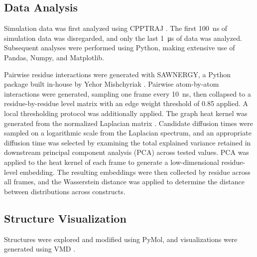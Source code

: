 \subsection{Data Analysis}
\label{chap:sawnergy}

Simulation data was first analyzed using CPPTRAJ \parencite{roePTRAJCPPTRAJSoftware2013}. The first \qty{100}{\nano\second} of simulation data was disregarded, and only the last \qty{1}{\micro\second} of data was analyzed. Subsequent analyses were performed using Python, making extensive use of Pandas, Numpy, and Matplotlib.

Pairwise residue interactions were generated with SAWNERGY, a Python package built in-house by Yehor Mishchyriak \parencite{Mishchyriak_SAWNERGY_A_Python}. Pairwise atom-by-atom interactions were generated, sampling one frame every \qty{10}{\nano\second}, then collapsed to a residue-by-residue level matrix with an edge weight threshold of \num{0.85} applied. A local thresholding protocol was additionally applied. The graph heat kernel was generated from the normalized Laplacian matrix \parencite{BenMasters}. Candidate diffusion times were sampled on a logarithmic scale from the Laplacian spectrum, and an appropriate diffusion time was selected by examining the total explained variance retained in downstream principal component analysis (PCA) across tested values. PCA was applied to the heat kernel of each frame to generate a low-dimensional residue-level embedding. The resulting embeddings were then collected by residue across all frames, and the Wasserstein distance was applied to determine the distance between distributions across constructs.

\subsection{Structure Visualization}

Structures were explored and modified using PyMol, and visualizations were generated using VMD \parencite{HUMP96, STON1998}.